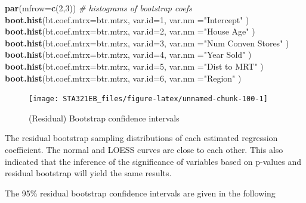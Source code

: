 \documentclass[
]{book}
\newenvironment{Shaded}{\begin{snugshade}}{\end{snugshade}}
\newcommand{\AttributeTok}[1]{\textcolor[rgb]{0.13,0.29,0.53}{#1}}
\newcommand{\CommentTok}[1]{\textcolor[rgb]{0.56,0.35,0.01}{\textit{#1}}}
\newcommand{\DecValTok}[1]{\textcolor[rgb]{0.00,0.00,0.81}{#1}}
\newcommand{\FunctionTok}[1]{\textcolor[rgb]{0.13,0.29,0.53}{\textbf{#1}}}
\newcommand{\NormalTok}[1]{#1}
\newcommand{\StringTok}[1]{\textcolor[rgb]{0.31,0.60,0.02}{#1}}
\begin{document}
\begin{Shaded}
\begin{Highlighting}[]
\FunctionTok{par}\NormalTok{(}\AttributeTok{mfrow=}\FunctionTok{c}\NormalTok{(}\DecValTok{2}\NormalTok{,}\DecValTok{3}\NormalTok{))  }\CommentTok{\# histograms of bootstrap coefs}
\FunctionTok{boot.hist}\NormalTok{(}\AttributeTok{bt.coef.mtrx=}\NormalTok{btr.mtrx, }\AttributeTok{var.id=}\DecValTok{1}\NormalTok{, }\AttributeTok{var.nm =}\StringTok{"Intercept"}\NormalTok{ )}
\FunctionTok{boot.hist}\NormalTok{(}\AttributeTok{bt.coef.mtrx=}\NormalTok{btr.mtrx, }\AttributeTok{var.id=}\DecValTok{2}\NormalTok{, }\AttributeTok{var.nm =}\StringTok{"House Age"}\NormalTok{ )}
\FunctionTok{boot.hist}\NormalTok{(}\AttributeTok{bt.coef.mtrx=}\NormalTok{btr.mtrx, }\AttributeTok{var.id=}\DecValTok{3}\NormalTok{, }\AttributeTok{var.nm =}\StringTok{"Num Conven Stores"}\NormalTok{ )}
\FunctionTok{boot.hist}\NormalTok{(}\AttributeTok{bt.coef.mtrx=}\NormalTok{btr.mtrx, }\AttributeTok{var.id=}\DecValTok{4}\NormalTok{, }\AttributeTok{var.nm =}\StringTok{"Year Sold"}\NormalTok{ )}
\FunctionTok{boot.hist}\NormalTok{(}\AttributeTok{bt.coef.mtrx=}\NormalTok{btr.mtrx, }\AttributeTok{var.id=}\DecValTok{5}\NormalTok{, }\AttributeTok{var.nm =}\StringTok{"Dist to MRT"}\NormalTok{ )}
\FunctionTok{boot.hist}\NormalTok{(}\AttributeTok{bt.coef.mtrx=}\NormalTok{btr.mtrx, }\AttributeTok{var.id=}\DecValTok{6}\NormalTok{, }\AttributeTok{var.nm =}\StringTok{"Region"}\NormalTok{ )}
\end{Highlighting}
\end{Shaded}

\begin{figure}

{\centering \texttt{[image: STA321EB\_files/figure-latex/unnamed-chunk-100-1]} 

}

\caption{(Residual) Bootstrap confidence intervals}\label{fig:unnamed-chunk-100}
\end{figure}

The residual bootstrap sampling distributions of each estimated regression coefficient. The normal and LOESS curves are close to each other. This also indicated that the inference of the significance of variables based on p-values and residual bootstrap will yield the same results.

The 95\% residual bootstrap confidence intervals are given in the following
\end{document}
